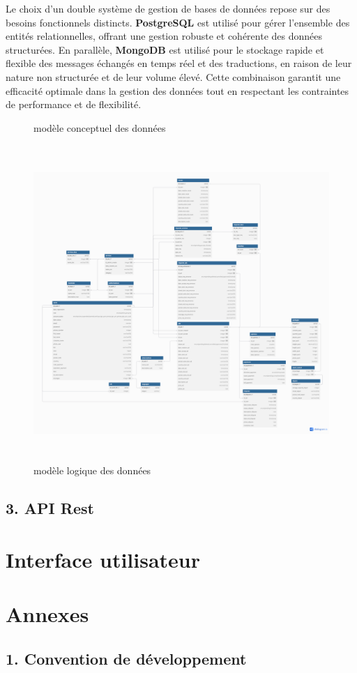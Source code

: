 \documentclass{report}
\begin{document}
\noindent Le choix d’un double système de gestion de bases de données repose sur des besoins fonctionnels distincts. \textbf{PostgreSQL} est utilisé pour gérer l’ensemble des entités relationnelles, offrant une gestion robuste et cohérente des données structurées. En parallèle, \textbf{MongoDB} est utilisé pour le stockage rapide et flexible des messages échangés en temps réel et des traductions, en raison de leur nature non structurée et de leur volume élevé. Cette combinaison garantit une efficacité optimale dans la gestion des données tout en respectant les contraintes de performance et de flexibilité.
\vspace{0.2cm}
\begin{figure}[H]
    \centering
    
    \caption{modèle conceptuel des données}
\end{figure}
\begin{figure}[H]
    \centering
    \includegraphics[height=12cm]{mld.png}
    \caption{modèle logique des données}
\end{figure}
\vspace{0.5cm}

\subsection*{3. API Rest}
\vspace{0.2cm}%
\vspace{1cm}

\section*{\centering Interface utilisateur}
\vspace{0.5cm}
\vspace{0.2cm}
\vspace{1cm}

\section*{\centering Annexes}
\vspace{0.5cm}
\subsection*{1. Convention de développement}
\vspace{0.2cm}
\end{document}
